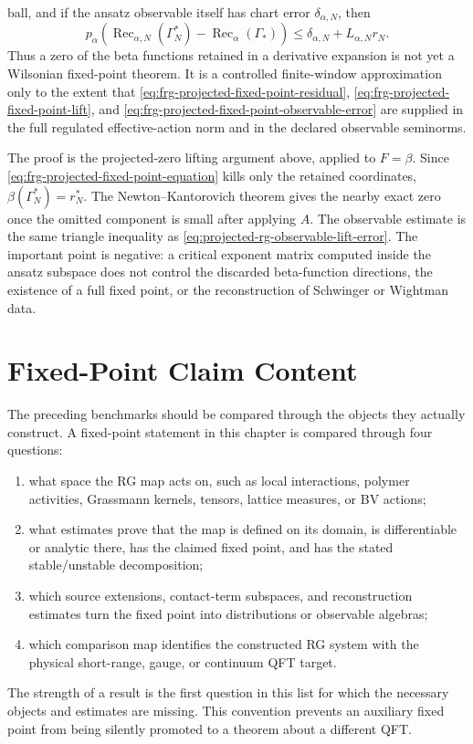 \begin{controlledapproximation}
ball, and if the ansatz observable itself has chart error
\(\delta_{\alpha,N}\), then
\begin{equation}
  p_\alpha\!\left(
    \operatorname{Rec}_{\alpha,N}(\Gamma_N^\ast)
    -
    \operatorname{Rec}_\alpha(\Gamma_\ast)
  \right)
  \le
  \delta_{\alpha,N}+L_{\alpha,N}r_N .
  \label{eq:frg-projected-fixed-point-observable-error}
\end{equation}
Thus a zero of the beta functions retained in a derivative expansion is not
yet a Wilsonian fixed-point theorem.  It is a controlled finite-window
approximation only to the extent that
\eqref{eq:frg-projected-fixed-point-residual},
\eqref{eq:frg-projected-fixed-point-lift}, and
\eqref{eq:frg-projected-fixed-point-observable-error} are supplied in the
full regulated effective-action norm and in the declared observable
seminorms.
\end{controlledapproximation}

\noindent
The proof is the projected-zero lifting argument above, applied to
\(F=\beta\).  Since \eqref{eq:frg-projected-fixed-point-equation} kills only
the retained coordinates, \(\beta(\Gamma_N^\ast)=r_N^\ast\).  The
Newton--Kantorovich theorem gives the nearby exact zero once the omitted
component is small after applying \(A\).  The observable estimate is the same
triangle inequality as
\eqref{eq:projected-rg-observable-lift-error}.  The important point is
negative: a critical exponent matrix computed inside the ansatz subspace
does not control the discarded beta-function directions, the existence of a
full fixed point, or the reconstruction of Schwinger or Wightman data.

\section{Fixed-Point Claim Content}
\label{sec:rg-fixed-point-claim-content}

The preceding benchmarks should be compared through the objects they actually
construct.  A fixed-point statement in this chapter is compared through four
questions:
\begin{enumerate}
  \item what space the RG map acts on, such as local interactions, polymer
  activities, Grassmann kernels, tensors, lattice measures, or BV actions;
  \item what estimates prove that the map is defined on its domain, is
  differentiable or analytic there, has the claimed fixed point, and has the
  stated stable/unstable decomposition;
  \item which source extensions, contact-term subspaces, and reconstruction
  estimates turn the fixed point into distributions or observable algebras;
  \item which comparison map identifies the constructed RG system with the
  physical short-range, gauge, or continuum QFT target.
\end{enumerate}
The strength of a result is the first question in this list for which the
necessary objects and estimates are missing.  This convention prevents an
auxiliary fixed point from being silently promoted to a theorem about a
different QFT.

